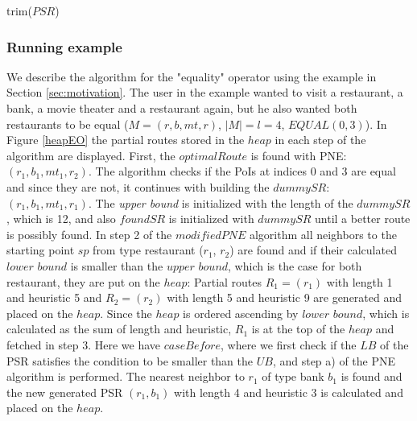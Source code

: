 \begin{procedure}[H]
\caption{trim($PSR$)}
\label{proc:trim}
\end{procedure}

\subsubsection{Running example}
We describe the algorithm for the "equality" operator using the example in Section \ref{sec:motivation}. The user in the example wanted to visit a restaurant, a bank, a movie theater and a restaurant again, but he also wanted both restaurants to be equal ($M = (r, b, mt, r)$, $|M| = l = 4$, $EQUAL(0, 3)$). In Figure \ref{heapEO} the partial routes stored in the $heap$ in each step of the algorithm are displayed. \newline
First, the $optimalRoute$ is found with PNE: $(r_1, b_1, mt_1, r_2)$. The algorithm checks if the PoIs at indices 0 and 3 are equal and since they are not, it continues with building the $dummySR$: $(r_1, b_1, mt_1, r_1)$. The \textit{upper bound} is initialized with the length of the $dummySR$, which is 12, and also $foundSR$ is initialized with $dummySR$ until a better route is possibly found. \newline
In step 2 of the $modifiedPNE$ algorithm all neighbors to the starting point $sp$ from type restaurant ($r_1$, $r_2$) are found and if their calculated $lower$ $bound$ is smaller than the $upper$ $bound$, which is the case for both restaurant, they are put on the $heap$: Partial routes $R_1 = (r_1)$ with length 1 and heuristic 5 and $R_2 = (r_2)$ with length 5 and heuristic 9 are generated and placed on the $heap$. Since the $heap$ is ordered ascending by $lower$ $bound$, which is calculated as the sum of length and heuristic, $R_1$ is at the top of the $heap$ and fetched in step 3. Here we have $caseBefore$, where we first check if the $LB$ of the PSR satisfies the condition to be smaller than the $UB$, and step a) of the PNE algorithm is performed. The nearest neighbor to $r_1$ of type bank $b_1$ is found and the new generated PSR $(r_1, b_1)$ with length 4 and heuristic 3 is calculated and placed on the $heap$. \newline
